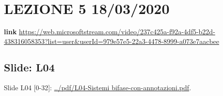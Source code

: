 \section*{LEZIONE 5 18/03/2020}
\textbf{link} \url{https://web.microsoftstream.com/video/237c425a-f92a-4df5-b22d-438316058353?list=user&userId=979e57e5-22a3-4478-8999-a073e7aacbee}
\subsection*{Slide: L04}
Slide L04 [0-32]: \url{../pdf/L04-Sistemi bifase-con-annotazioni.pdf}.\newline
\newline
